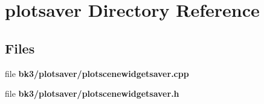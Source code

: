 \section{plotsaver Directory Reference}
\label{dir_acc221886d5e2418b9568eb831537cc1}
\subsection*{Files}
\begin{DoxyCompactItemize}
\item 
file {\bf bk3/plotsaver/plotscenewidgetsaver.\+cpp}
\item 
file {\bf bk3/plotsaver/plotscenewidgetsaver.\+h}
\end{DoxyCompactItemize}
